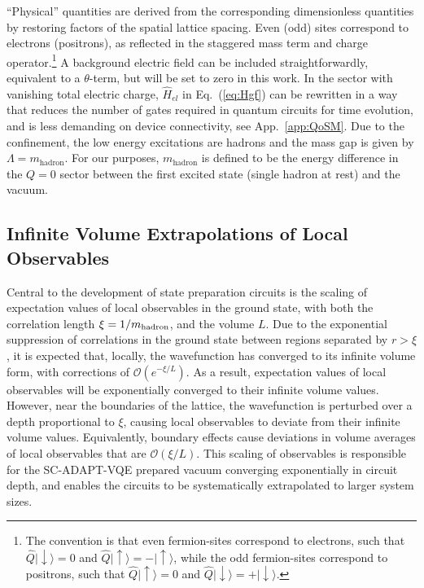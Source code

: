 \documentclass[aps, pra, onecolumn, tightenlines, letterpaper, amsmath, amssymb, preprintnumbers, floatfix, longbibliography, nofootinbib]{revtex4-2}
\begin{document}
``Physical'' quantities are 
derived from the corresponding dimensionless quantities by restoring factors of the 
spatial lattice spacing.
Even (odd) sites correspond to electrons (positrons), as reflected in the staggered mass term and charge operator.\footnote{The convention is that even fermion-sites correspond to electrons, 
such that $\hat Q \lvert\downarrow\rangle = 0$ and 
$ \hat Q \lvert\uparrow\rangle = -\lvert\uparrow\rangle$,
while
the odd fermion-sites correspond to positrons, such that 
$ \hat Q \lvert\uparrow\rangle = 0$ and 
$\hat Q \lvert\downarrow\rangle = +\lvert\downarrow\rangle$.
}
A background electric field can be included straightforwardly, 
equivalent to a  $\theta$-term,  but
will be set to zero in this work.
In the sector with vanishing total electric charge, $\hat{H}_{el}$ 
in Eq.~(\ref{eq:Hgf})
can be rewritten 
in a way that reduces the number of gates required in quantum circuits for time evolution, and is less demanding on device connectivity, see App.~\ref{app:QoSM}.
Due to the confinement, the low energy excitations are hadrons and the mass gap is given by $\Lambda = m_{\text{hadron}}$. For our purposes, $m_{\text{hadron}}$ is defined to be the energy difference in the $Q=0$ sector between the first excited state (single hadron at rest) and the vacuum.



\subsection{Infinite Volume Extrapolations of Local Observables}
\label{sec:infVolExtra}
\noindent
Central to the development of state preparation circuits is the scaling of expectation values of local observables in the ground state, 
with both the correlation length $\xi = 1/m_{{\rm hadron}}$, and the volume $L$.
Due to the exponential suppression of correlations in the ground state 
between regions separated by $r>\xi$, it is expected that, locally, the wavefunction has converged to its infinite volume form, with corrections of ${\mathcal O}(e^{-\xi/L})$.
As a result, expectation values of local observables will 
be exponentially converged to their infinite volume values.
However, near the boundaries of the lattice, the wavefunction is perturbed over a depth proportional to $\xi$, causing local observables to deviate from their infinite volume values.
Equivalently, boundary effects cause deviations in volume averages of local observables that are ${\mathcal O}(\xi/L)$.
This scaling of observables is responsible for the SC-ADAPT-VQE prepared vacuum converging exponentially in circuit depth, and enables the circuits to be systematically extrapolated to larger system sizes.
\end{document}
